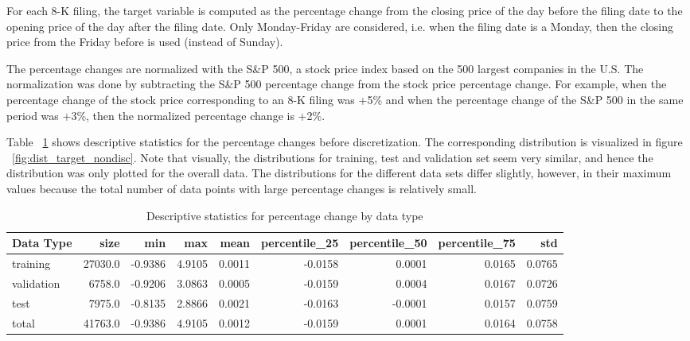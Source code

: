 \documentclass{article}
\begin{document}
	For each 8-K filing, the target variable is computed as the percentage change from the closing price of the day before the filing date to the opening price of the day after the filing date. Only Monday-Friday are considered, i.e. when the filing date is a Monday, then the closing price from the Friday before is used (instead of Sunday). 
	
	The percentage changes are normalized with the S\&P 500, a stock price index based on the 500 largest companies in the U.S. The normalization was done by subtracting the S\&P 500 percentage change from the stock price percentage change. For example, when the percentage change of the stock price corresponding to an 8-K filing was +5\% and when the percentage change of the S\&P 500 in the same period was +3\%, then the normalized percentage change is +2\%.
	
	Table ~\ref{table:stats_by_data} shows descriptive statistics for the percentage changes before discretization. The corresponding distribution is visualized in figure ~\ref{fig:dist_target_nondisc}. Note that visually, the distributions for training, test and validation set seem very similar, and hence the distribution was only plotted for the overall data. The distributions for the different data sets differ slightly, however, in their maximum values because the total number of data points with large percentage changes is relatively small. 

	
	\begin{table}[h!]
		\centering
		\caption{Descriptive statistics for percentage change by data type}
		\label{table:stats_by_data}
		
		\begin{tabular}{lrrrrrrrr}
			\toprule
			Data Type &     size &     min &     max &    mean &  percentile\_25 &  percentile\_50 &  percentile\_75 &     std \\
			\midrule
			training   &  27030.0 & -0.9386 &  4.9105 &  0.0011 &        -0.0158 &         0.0001 &         0.0165 &  0.0765 \\
			validation &   6758.0 & -0.9206 &  3.0863 &  0.0005 &        -0.0159 &         0.0004 &         0.0167 &  0.0726 \\
			test       &   7975.0 & -0.8135 &  2.8866 &  0.0021 &        -0.0163 &        -0.0001 &         0.0157 &  0.0759 \\
			total      &  41763.0 & -0.9386 &  4.9105 &  0.0012 &        -0.0159 &         0.0001 &         0.0164 &  0.0758 \\
			\bottomrule
		\end{tabular}
		
	\end{table}%
	
\end{document}
